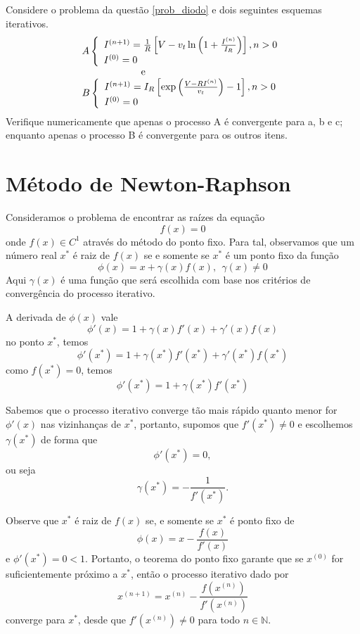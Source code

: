 \begin{Exercise} Considere o problema da questão \ref{prob_diodo} e dois seguintes esquemas iterativos.
$$\begin{array}{l}
A\left\{
\begin{array}{ll}
I^{(n+1)}=\frac{1}{R}\left[V-v_t\ln\left(1+\frac{I^{(n)}}{I_R}\right)\right],n>0\\
I^{(0)}=0
\end{array}\right.\\ \hspace{2cm} \hbox{ e }\\
B\left\{
\begin{array}{ll}
I^{(n+1)}=I_R\left[\exp\left(\frac{V-RI^{(n)}}{v_t}\right)-1\right],n>0\\
I^{(0)}=0
\end{array}\right.
\end{array}
$$
Verifique numericamente que apenas o processo A é convergente para a, b e c; enquanto apenas o processo B é convergente para os outros itens.
\end{Exercise}

\section{Método de Newton-Raphson}

Consideramos o problema de encontrar as raízes da equação
$$f(x)=0$$ onde $f(x)\in C^1$ através do método do ponto fixo.
Para tal, observamos que um número real $x^*$ é raiz de $f(x)$ se e somente se $x^*$ é um ponto fixo da função
$$\phi(x)=x+\gamma(x)f(x), ~~\gamma(x)\neq 0$$
Aqui $\gamma(x)$ é uma função que será escolhida com base nos critérios de convergência do processo iterativo.


A derivada de $\phi(x)$ vale
$$\phi'(x)=1+\gamma(x)f'(x)+\gamma'(x)f(x)$$
no ponto $x^*$, temos
$$\phi'(x^*)=1+\gamma(x^*)f'(x^*)+\gamma'(x^*)f(x^*)$$
como $f(x^*)=0$, temos
$$\phi'(x^*)=1+\gamma(x^*)f'(x^*)$$

Sabemos que o processo iterativo converge tão mais rápido quanto menor for $\phi'(x)$ nas  vizinhanças de $x^*$, portanto, supomos que $f'(x^*)\neq 0$ e escolhemos $\gamma(x^*)$ de forma que
$$\phi'(x^*)=0,$$ ou seja
$$\gamma(x^*)=-\frac{1}{f'(x^*)}.$$

Observe que $x^*$ é raiz de $f(x)$ se, e somente se $x^*$ é ponto fixo de
$$\phi(x)=x-\frac{f(x)}{f'(x)}$$
e $\phi'(x^*)=0<1$. Portanto, o teorema do ponto fixo garante que se $x^{(0)}$ for suficientemente próximo a $x^*$, então o processo iterativo dado por
$$x^{(n+1)}=x^{(n)}-\frac{f(x^{(n)})}{f'(x^{(n)})}$$
converge para $x^*$, desde que $f'(x^{(n)})\neq 0 $ para todo $n\in\mathbb{N}$.

